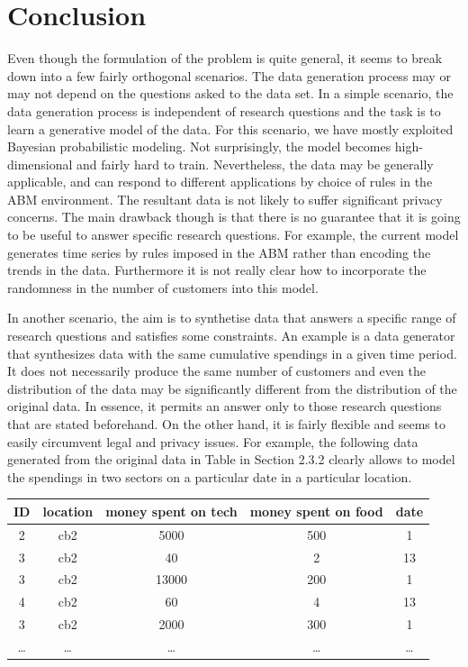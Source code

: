 \documentclass[]{article}
\begin{document}
\section{Conclusion}\label{conclusion}

Even though the formulation of the problem is quite general, it seems to
break down into a few fairly orthogonal scenarios. The data generation
process may or may not depend on the questions asked to the data set. In
a simple scenario, the data generation process is independent of
research questions and the task is to learn a generative model of the
data. For this scenario, we have mostly exploited Bayesian probabilistic
modeling. Not surprisingly, the model becomes high-dimensional and
fairly hard to train. Nevertheless, the data may be generally
applicable, and can respond to different applications by choice of rules
in the ABM environment. The resultant data is not likely to suffer
significant privacy concerns. The main drawback though is that there is
no guarantee that it is going to be useful to answer specific research
questions. For example, the current model generates time series by rules
imposed in the ABM rather than encoding the trends in the data.
Furthermore it is not really clear how to incorporate the randomness in
the number of customers into this model.

In another scenario, the aim is to synthetise data that answers a
specific range of research questions and satisfies some constraints. An
example is a data generator that synthesizes data with the same
cumulative spendings in a given time period. It does not necessarily
produce the same number of customers and even the distribution of the
data may be significantly different from the distribution of the
original data. In essence, it permits an answer only to those research
questions that are stated beforehand. On the other hand, it is fairly
flexible and seems to easily circumvent legal and privacy issues. For
example, the following data generated from the original data in Table in
Section 2.3.2 clearly allows to model the spendings in two sectors on a
particular date in a particular location.

\begin{longtable}[]{@{}ccccc@{}}
\toprule
ID & location & money spent on tech & money spent on food &
date\tabularnewline
\midrule
\endhead
2 & cb2 & 5000 & 500 & 1\tabularnewline
3 & cb2 & 40 & 2 & 13\tabularnewline
3 & cb2 & 13000 & 200 & 1\tabularnewline
4 & cb2 & 60 & 4 & 13\tabularnewline
3 & cb2 & 2000 & 300 & 1\tabularnewline
\ldots{} & \ldots{} & \ldots{} & \ldots{} & \ldots{}\tabularnewline
\bottomrule
\end{longtable}
\end{document}
